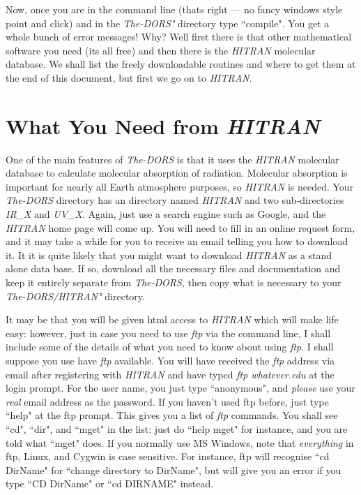 \documentclass[12pt]{article}
\begin{document}
Now, once you are in the command line (thats right --- no fancy
 windows style point and click) and in the {\it The-DORS"} directory type ``compile". You get a whole bunch of
error messages! Why? Well first there is that other mathematical software you need (its all free) 
and then there is the {\it HITRAN} molecular database. We shall list the
freely downloadable routines and where to get them at the end of this document,
but first we go on to {\it HITRAN}.

\section{What You Need from {\it HITRAN}}


One of the main features of  {\it The-DORS} is that it uses the 
{\it HITRAN} \cite{RothmanETAL:Mybib} molecular database to calculate molecular absorption of radiation.
Molecular absorption is important for nearly all Earth
atmosphere purposes, so {\it HITRAN} is needed. Your {\it The-DORS} directory has an directory
named {\it HITRAN} and two sub-directories {\it IR\_X} and {\it UV\_X}.
 Again, just use a search engine such as Google, and the {\it HITRAN} home page will come up. You will need to fill in an online request form, and it may take a while for
you to receive an email telling you how to download it. It it is quite likely that you might want to 
download {\it HITRAN} as a stand alone data base. If so, download all the necessary files
and documentation and keep it entirely separate from {\it The-DORS}, then copy what is
necessary to your {\it The-DORS/HITRAN"} directory.

It may be that you will be given html access to {\it HITRAN} which will make life easy: however, just in case you need
to use {\it ftp} via the command line, I shall include some of the details  of what you need to know 
about using {\it ftp}.
I shall suppose you use have {\it ftp} available. 
You will have received
 the {\it ftp} address via email after registering with {\it HITRAN} and have typed {\it ftp whatever.edu} 
at the login prompt. 
For the user name, you just type ``anonymous", and {\it please} use your {\it real}
 email address as the password. If you haven't used ftp before, just type ``help" at the ftp prompt.
This gives you a list of {\it ftp} commands. 
You shall see ``cd", ``dir", and ``mget" in the list: just do ``help mget" for instance, and you are told
what ``mget" does.  If you normally use MS Windows, note 
that {\it everything} in ftp, Linux,  and Cygwin is case sensitive. 
For instance, ftp will recognise 	``cd DirName" for ``change directory to
 DirName", but
will give you an error if you type ``CD DirName" or ``cd DIRNAME" instead. 
\end{document}
